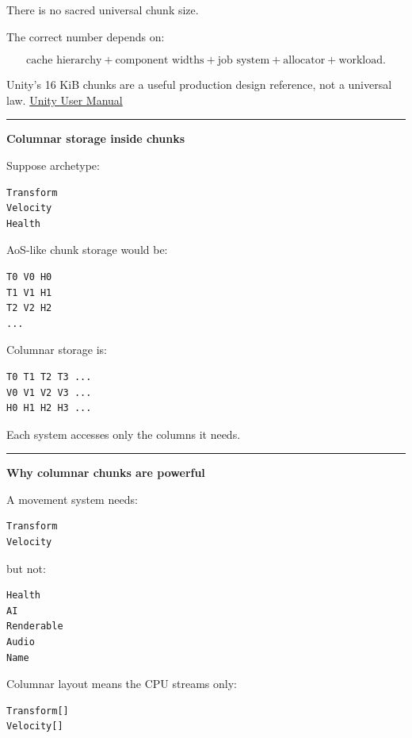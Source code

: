There is no sacred universal chunk size.

The correct number depends on:

\[
\text{cache hierarchy}
+
\text{component widths}
+
\text{job system}
+
\text{allocator}
+
\text{workload}.
\]

Unity's 16 KiB chunks are a useful production design reference, not a universal law. \href{https://docs.unity.cn/Packages/com.unity.entities\%401.0/manual/concepts-archetypes.html?utm_source=chatgpt.com}{Unity User Manual}

\begin{center}\rule{0.5\linewidth}{0.5pt}\end{center}

\textbf{Columnar storage inside chunks}

Suppose archetype:

\begin{verbatim}
Transform
Velocity
Health
\end{verbatim}

AoS-like chunk storage would be:

\begin{verbatim}
T0 V0 H0
T1 V1 H1
T2 V2 H2
...
\end{verbatim}

Columnar storage is:

\begin{verbatim}
T0 T1 T2 T3 ...
V0 V1 V2 V3 ...
H0 H1 H2 H3 ...
\end{verbatim}

Each system accesses only the columns it needs.

\begin{center}\rule{0.5\linewidth}{0.5pt}\end{center}

\textbf{Why columnar chunks are powerful}

A movement system needs:

\begin{verbatim}
Transform
Velocity
\end{verbatim}

but not:

\begin{verbatim}
Health
AI
Renderable
Audio
Name
\end{verbatim}

Columnar layout means the CPU streams only:

\begin{verbatim}
Transform[]
Velocity[]
\end{verbatim}

